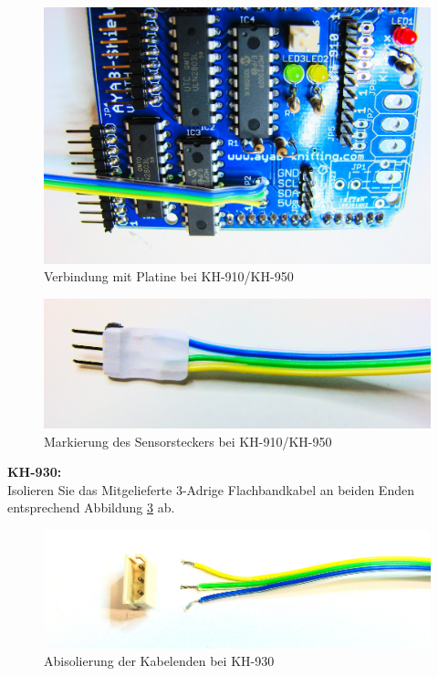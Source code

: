 \documentclass[fleqn,10pt]{SelfArx} %
\begin{document}
\begin{figure}[tbhp]\centering
\includegraphics[width=\linewidth]{abb7_4}
\caption{Verbindung mit Platine bei KH-910/KH-950}
\label{fig:abb7_4}
\end{figure}

\begin{figure}[tbhp]\centering
\includegraphics[width=\linewidth]{abb7_5}
\caption{Markierung des Sensorsteckers bei KH-910/KH-950}
\label{fig:abb7_5}
\end{figure}

\FloatBarrier

\textbf{KH-930:} \\

Isolieren Sie das Mitgelieferte 3-Adrige Flachbandkabel an beiden Enden entsprechend Abbildung \ref{fig:abb7_6} ab.

\begin{figure}[tbhp]\centering
\includegraphics[width=\linewidth]{abb7_6}
\caption{Abisolierung der Kabelenden bei KH-930}
\label{fig:abb7_6}
\end{figure}
\end{document}
